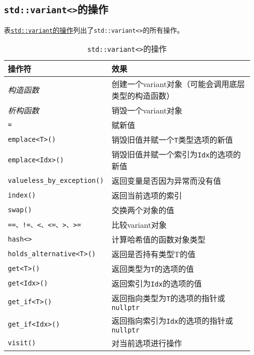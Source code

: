 \subsection{\texttt{std::variant<>}的操作}
表\hyperref[t16.1]{\texttt{std::variant}的操作}列出了\texttt{std::variant<>}的所有操作。
\begin{table}[htb]
    \centering
    \begin{tabular}{l|l}
        \hline
        \textbf{操作符}                        & \textbf{效果}                                \\
        \hline
        \emph{构造函数}                         & 创建一个variant对象（可能会调用底层类型的构造函数）              \\
        \emph{析构函数}                         & 销毁一个variant对象                              \\
        \texttt{=}                          & 赋新值                                        \\
        \texttt{emplace<T>()}               & 销毁旧值并赋一个\texttt{T}类型选项的新值                  \\
        \texttt{emplace<Idx>()}             & 销毁旧值并赋一个索引为\texttt{Idx}的选项的新值              \\
        \texttt{valueless\_by\_exception()} & 返回变量是否因为异常而没有值                             \\
        \texttt{index()}                    & 返回当前选项的索引                                  \\
        \texttt{swap()}                     & 交换两个对象的值                                   \\
        \texttt{==、!=、<、<=、>、>=}            & 比较variant对象                                \\
        \texttt{hash<>}                     & 计算哈希值的函数对象类型                               \\
        \texttt{holds\_alternative<T>()}    & 返回是否持有类型T的值                                \\
        \texttt{get<T>()}                   & 返回类型为\texttt{T}的选项的值                       \\
        \texttt{get<Idx>()}                 & 返回索引为\texttt{Idx}的选项的值                     \\
        \texttt{get\_if<T>()}               & 返回指向类型为\texttt{T}的选项的指针或\texttt{nullptr}   \\
        \texttt{get\_if<Idx>()}             & 返回指向索引为\texttt{Idx}的选项的指针或\texttt{nullptr} \\
        \texttt{visit()}                    & 对当前选项进行操作                                  \\
        \hline
    \end{tabular}
    \caption{\texttt{std::variant<>}的操作}
    \label{t16.1}
\end{table}

